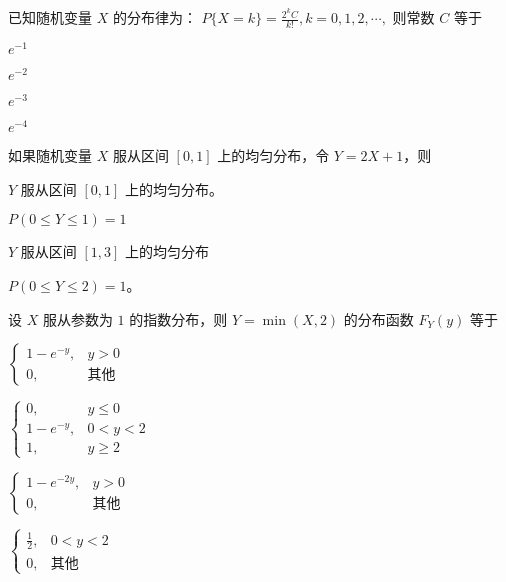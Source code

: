 \documentclass{exam-zh}
\begin{document}
\begin{question}
  已知随机变量 $X$ 的分布律为：  
  $P\{X = k\} = \frac{2^k C}{k!}, k = 0,1,2,\cdots,$  
  则常数 $C$ 等于 \paren[B]
  \begin{choices}
    \item $e^{-1}$  
    \item $e^{-2}$  
    \item $e^{-3}$  
    \item $e^{-4}$  
  \end{choices}
\end{question}

\begin{question}
  如果随机变量 $X$ 服从区间 $[0,1]$ 上的均匀分布，令 $Y = 2X + 1$，则 \paren[C]
  \begin{choices}
    \item $Y$ 服从区间 $[0,1]$ 上的均匀分布。  
    \item $P(0 \leq Y \leq 1) = 1$  
    \item $Y$ 服从区间 $[1,3]$ 上的均匀分布  
    \item $P(0 \leq Y \leq 2) = 1$。  
  \end{choices}
\end{question}

\begin{question}
  设 $X$ 服从参数为 $1$ 的指数分布，则  
  $Y = \min(X, 2)$ 的分布函数 $F_Y(y)$ 等于 \paren[B]
  \begin{choices}
    \item 
    $
    \begin{cases} 
    1 - e^{-y}, & y > 0 \\ 
    0, & \text{其他} 
    \end{cases}
    $
    
    \item 
    $
    \begin{cases} 
    0, & y \leq 0 \\ 
    1 - e^{-y}, & 0 < y < 2 \\ 
    1, & y \geq 2 
    \end{cases}
    $
    
    \item 
    $
    \begin{cases} 
    1 - e^{-2y}, & y > 0 \\ 
    0, & \text{其他} 
    \end{cases}
    $
    
    \item 
    $
    \begin{cases} 
    \frac{1}{2}, & 0 < y < 2 \\ 
    0, & \text{其他} 
    \end{cases}
    $
  \end{choices}
\end{question}
\end{document}
